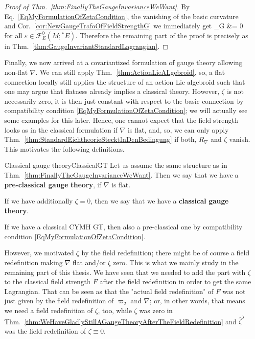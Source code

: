 \begin{proof}[Proof of Thm.~\ref{thm:FinallyTheGaugeInvarianceWeWant}]
\leavevmode\newline
By Eq.~\eqref{EqMyFormulationOfZetaCondition}, the vanishing of the basic curvature and Cor.~\ref{cor:NewGaugeTrafoOfFieldStrengthG} we immediately get
\bas
\delta_\varepsilon G
&=
0
\eas
for all $\varepsilon \in \mathcal{F}^0_E(M; {}^*E)$. Therefore the remaining part of the proof is precisely as in Thm.~\ref{thm:GaugeInvariantStandardLagrangian}.
\end{proof}

Finally, we now arrived at a covariantized formulation of gauge theory allowing non-flat $\nabla$. We can still apply Thm.~\ref{thm:ActionLieALgebroid}, so, a flat connection locally still applies the structure of an action Lie algebroid such that one may argue that flatness already implies a classical theory. However, $\zeta$ is not necessarily zero, it is then just constant with respect to the basic connection by compatibility condition \eqref{EqMyFormulationOfZetaCondition}; we will actually see some examples for this later. Hence, one cannot expect that the field strength looks as in the classical formulation if $\nabla$ is flat, and, so, we can only apply Thm.~\ref{thm:StandardEichtheorieStecktInDenBedingung} if both, $R_\nabla$ and $\zeta$ vanish. This motivates the following definitions.

\begin{definitions}{Classical gauge theory}{ClassicalGT}
Let us assume the same structure as in Thm.~\ref{thm:FinallyTheGaugeInvarianceWeWant}.
Then we say that we have a \textbf{pre-classical gauge theory}, if $\nabla$ is flat.

If we have additionally $\zeta = 0$, then we say that we have a \textbf{classical gauge theory}.
\end{definitions}

\begin{remark}
\leavevmode\newline
If we have a classical CYMH GT, then also a pre-classical one by compatibility condition \ref{EqMyFormulationOfZetaCondition}.
\end{remark}

However, we motivated $\zeta$ by the field redefinition; there might be of course a field redefinition making $\nabla$ flat and/or $\zeta$ zero. This is what we mainly study in the remaining part of this thesis. We have seen that we needed to add the part with $\zeta$ to the classical field strength $F$ after the field redefinition in order to get the same Lagrangian. That can be seen as that the "actual field redefinition" of $F$ was not just given by the field redefinition of $\varpi_2$ and $\nabla$; or, in other words, that means we need a field redefinition of $\zeta$, too, while $\zeta$ was zero in Thm.~\ref{thm:WeHaveGladlyStillAGaugeTheoryAfterTheFieldRedefinition} and $\widehat{\zeta}^\lambda$ was the field redefinition of $\zeta \equiv 0$.

